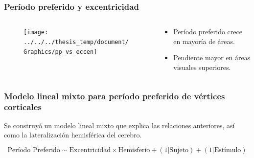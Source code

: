 \documentclass[
11pt, %
%
aspectratio=169, %
]{beamer}
\begin{document}
	\begin{frame}
		\frametitle{Per\'iodo preferido y excentricidad}
		
			\begin{columns}[t] %
			
			
			\begin{column}{0.7\textwidth}
				\begin{figure}
					
					\texttt{[image: ../../../thesis\_temp/document/Graphics/pp\_vs\_eccen]}
				\end{figure}
			\end{column}
			
			\begin{column}{0.3\textwidth} %
				\begin{itemize}
					\item Per\'iodo preferido crece en mayor\'ia de \'areas.
					\item Pendiente mayor en \'areas visuales superiores.
					
				\end{itemize}
				
				
				
			\end{column}					
			
		\end{columns}
				
		
		
	\end{frame}
	
	\begin{frame}
		\frametitle{Modelo lineal mixto para per\'iodo preferido de v\'ertices corticales}
		
		Se construy\'o un modelo lineal mixto que explica las relaciones anteriores, as\'i como la lateralizaci\'on hemisf\'erica del cerebro.
		
		\begin{equation*}
			\text{Período Preferido} \sim  \text{Excentricidad} \times \text{Hemisferio} + (1 | \text{Sujeto}) + (1 | \text{Estímulo})	
			\label{mlm_pp}
		\end{equation*}
		
	\end{frame}
\end{document}
